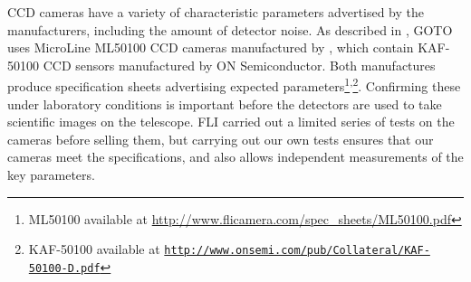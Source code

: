 \begin{colsection}

CCD cameras have a variety of characteristic parameters advertised by the manufacturers, including the amount of detector noise. As described in , GOTO uses MicroLine ML50100 CCD cameras manufactured by , which contain KAF-50100 CCD sensors manufactured by ON Semiconductor. Both manufactures produce specification sheets advertising expected parameters\footnote{ML50100 available at \url{http://www.flicamera.com/spec_sheets/ML50100.pdf}}\textsuperscript{,}\footnote{KAF-50100 available at \href{http://www.onsemi.com/pub/Collateral/KAF-50100-D.PDF}{\texttt{http://www.onsemi.com/pub/Collateral/KAF-50100-D.pdf}}}. Confirming these under laboratory conditions is important before the detectors are used to take scientific images on the telescope. FLI carried out a limited series of tests on the cameras before selling them, but carrying out our own tests ensures that our cameras meet the specifications, and also allows independent measurements of the key parameters.

\end{colsection}


